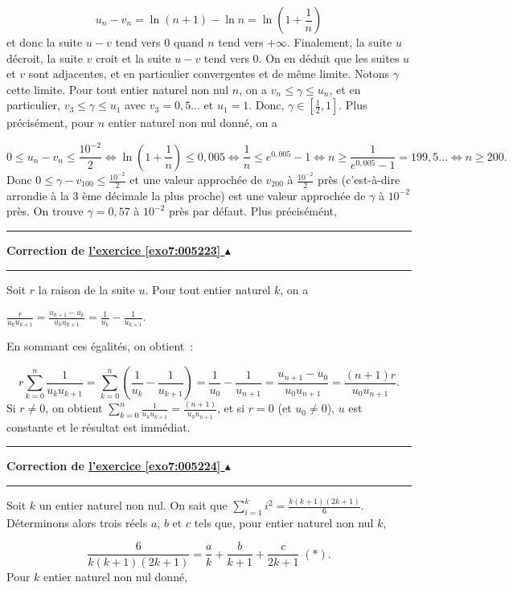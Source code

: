 \documentclass[11pt,a4paper]{article}
\newcounter{exo}
\newcommand{\correction}[1]{\hypertarget{cor7:#1}{}\label{cor7:#1}{\bf Correction de \hyperlink{exo7:#1}{l'exercice \ref{exo7:#1} $\blacktriangle$}}\vspace{1mm}\hrule\vspace{1mm}}
\newcommand{\fincorrection}{\vspace{1mm}\hrule\vspace*{7mm}}
\begin{document}
\begin{enumerate}
$$u_n-v_n=\ln(n+1)-\ln n=\ln\left(1+\frac{1}{n}\right)$$ 
et donc la suite $u-v$ tend vers 0 quand $n$ tend vers $+\infty$.
Finalement, la suite $u$ décroit, la suite $v$ croit et la suite $u-v$ tend vers $0$. On en déduit que les suites $u$ et $v$ sont adjacentes, et en particulier convergentes et de même limite. Notons $\gamma$ cette limite.
Pour tout entier naturel non nul $n$, on a $v_n\leq\gamma\leq u_n$, et en particulier, $v_3\leq\gamma\leq u_1$ avec $v_3=0,5...$ et $u_1=1$. Donc, $\gamma\in\left[\frac{1}{2},1\right]$.
Plus précisément, pour $n$ entier naturel non nul donné, on a

$$0\leq u_n-v_n\leq\frac{10^{-2}}{2}\Leftrightarrow\ln\left(1+\frac{1}{n}\right)\leq0,005\Leftrightarrow\frac{1}{n}\leq e^{0,005}-1\Leftrightarrow n\geq\frac{1}{e^{0,005}-1}=199,5...\Leftrightarrow n\geq200.$$
Donc $0\leq\gamma-v_{100}\leq\frac{10^{-2}}{2}$ et une valeur approchée de $v_{200}$ à $\frac{10^{-2}}{2}$ près (c'est-à-dire arrondie à la 3 ème décimale la plus proche) est une valeur approchée de $\gamma$ à $10^{-2}$ près. On trouve $\gamma=0,57$ à $10^{-2}$ près par défaut. Plus précisémént,

\begin{center}
\end{center}
\end{enumerate}
\fincorrection
\correction{005223}
Soit $r$ la raison de la suite $u$.
Pour tout entier naturel $k$, on a 

\begin{center}
$\frac{r}{u_ku_{k+1}}=\frac{u_{k+1}-u_k}{u_ku_{k+1}}=\frac{1}{u_k}-\frac{1}{u_{k+1}}$.
\end{center}
En sommant ces égalités, on obtient~:

$$r\sum_{k=0}^{n}\frac{1}{u_ku_{k+1}}=\sum_{k=0}^{n}\left(\frac{1}{u_k}-\frac{1}{u_{k+1}}\right)=\frac{1}{u_0}-\frac{1}{u_{n+1}}=\frac{u_{n+1}-u_0}{u_0u_{n+1}}=\frac{(n+1)r}{u_0u_{n+1}}.$$
Si $r\neq0$, on obtient $\sum_{k=0}^{n}\frac{1}{u_ku_{k+1}}=\frac{(n+1)}{u_0u_{n+1}}$, et si $r=0$ (et $u_0\neq0$), $u$ est constante et le résultat est immédiat.
\fincorrection
\correction{005224}
Soit $k$ un entier naturel non nul. On sait que $\sum_{i=1}^{k}i^2=\frac{k(k+1)(2k+1)}{6}$. Déterminons alors trois réels $a$, $b$ et $c$ tels que, pour entier naturel non nul $k$, 

$$\frac{6}{k(k+1)(2k+1)}=\frac{a}{k}+\frac{b}{k+1}+\frac{c}{2k+1}\;(*).$$
Pour $k$ entier naturel non nul donné,
\end{document}
